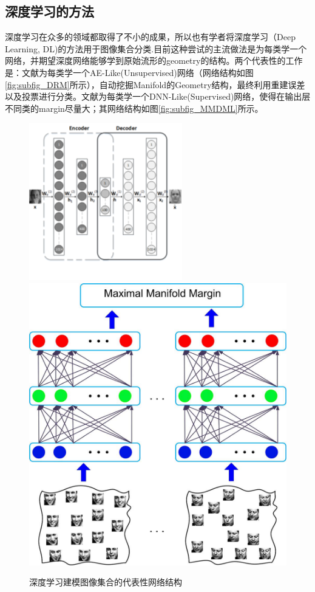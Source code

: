 \subsection{深度学习的方法}
\label{sec:current_Deeplearning}
深度学习在众多的领域都取得了不小的成果，所以也有学者将深度学习（Deep Learning, DL)的方法用于图像集合分类.目前这种尝试的主流做法是为每类学一个网络，并期望深度网络能够学到原始流形的geometry的结构。两个代表性的工作是：文献\cite{Deeplearning_DRM}为每类学一个AE-Like(Unsupervised)网络（网络结构如图\ref{fig:subfig_DRM}所示），自动挖掘Manifold的Geometry结构，最终利用重建误差以及投票进行分类。文献\cite{Deeplearning_MMDML}为每类学一个DNN-Like(Supervised)网络，使得在输出层不同类的margin尽量大；其网络结构如图\ref{fig:subfig_MMDML}所示。
\begin{figure}[h]
  \centering
      {\includegraphics[width=0.3\linewidth]{source/Deeplearning_DRM.png}}
  \hspace{4em}%
      {\includegraphics[width=0.3\linewidth]{source/Deeplearning_MMDML.png}}
  \caption{深度学习建模图像集合的代表性网络结构}
  \label{fig:Deepleaning_Nets}
\end{figure}


